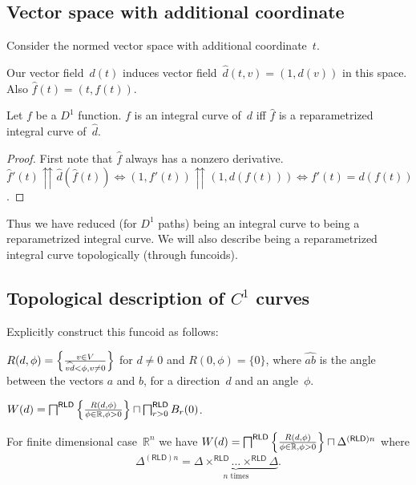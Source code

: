 \subsection{Vector space with additional coordinate}

Consider the normed vector space with additional coordinate~$t$.

Our vector field~$d(t)$ induces vector field~$\hat{d}(t,v)=(1,d(v))$ in this space. Also $\hat{f}(t)=(t,f(t))$.

\begin{prop}
Let $f$ be a $D^1$ function. $f$ is an integral curve of~$d$ iff $\hat{f}$ is a reparametrized integral curve of~$\hat{d}$.
\end{prop}

\begin{proof}
First note that $\hat{f}$ always has a nonzero derivative.
$\hat{f}'(t)\upuparrows \hat{d}(\hat{f}(t)) \Leftrightarrow (1,f'(t))\upuparrows (1,d(f(t))) \Leftrightarrow
f'(t)=d(f(t))$.
\end{proof}

Thus we have reduced (for $D^1$ paths) being an integral curve to being a reparametrized integral curve.
We will also describe being a reparametrized integral curve topologically (through funcoids).

\subsection{Topological description of $C^1$ curves}

Explicitly construct this funcoid as follows:

$R(d,\phi) = \left\{ \frac{v\in V}{\widehat{vd}<\phi, v\ne 0}\right\}$ for $d\ne 0$ and $R(0,\phi) = \{0\}$,
where $\widehat{ab}$ is the angle between the vectors $a$ and $b$,
for a direction~$d$ and an angle~$\phi$.

\begin{defn}
$W(d) = \bigsqcap^{\mathsf{RLD}}\left\{ \frac{R(d,\phi)}{\phi\in\mathbb{R},\phi>0}\right\} \sqcap \bigsqcap^{\mathsf{RLD}}_{r>0}B_r(0)$.
\end{defn}

\begin{prop}
For finite dimensional case~$\mathbb{R}^n$ we have
$W(d) = \bigsqcap^{\mathsf{RLD}}\left\{ \frac{R(d,\phi)}{\phi\in\mathbb{R},\phi>0}\right\} \sqcap \Delta^{(\mathsf{RLD})n}$
where \[ \Delta^{(\mathsf{RLD})n} = \underbrace{\Delta\times^{\mathsf{RLD}}\dots\times^{\mathsf{RLD}}\Delta}_{n\text{ times}}. \]
\end{prop}

